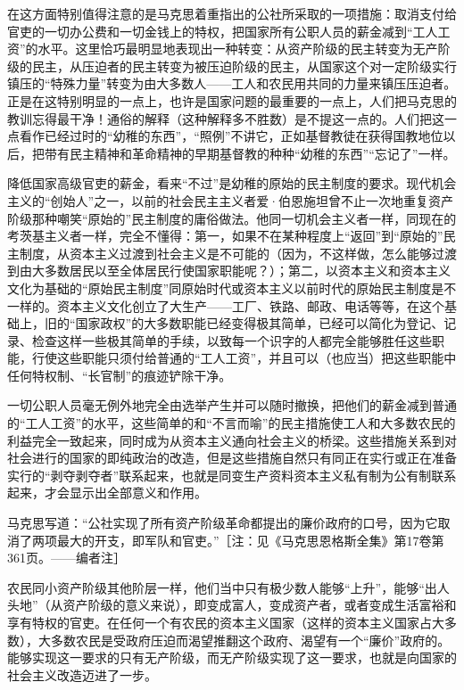 \documentclass[UTF8, 12pt, a4paper]{ctexrep}
\begin{document}
在这方面特别值得注意的是马克思着重指出的公社所采取的一项措施：取消支付给官吏的一切办公费和一切金钱上的特权，把国家所有公职人员的薪金减到“工人工资”的水平。这里恰巧最明显地表现出一种转变：从资产阶级的民主转变为无产阶级的民主，从压迫者的民主转变为被压迫阶级的民主，从国家这个对一定阶级实行镇压的“特殊力量”转变为由大多数人——工人和农民用共同的力量来镇压压迫者。正是在这特别明显的一点上，也许是国家问题的最重要的一点上，人们把马克思的教训忘得最干净！通俗的解释（这种解释多不胜数）是不提这一点的。人们把这一点看作已经过时的“幼稚的东西”，“照例”不讲它，正如基督教徒在获得国教地位以后，把带有民主精神和革命精神的早期基督教的种种“幼稚的东西”“忘记了”一样。

降低国家高级官吏的薪金，看来“不过”是幼稚的原始的民主制度的要求。现代机会主义的“创始人”之一，以前的社会民主主义者爱·伯恩施坦曾不止一次地重复资产阶级那种嘲笑“原始的”民主制度的庸俗做法。他同一切机会主义者一样，同现在的考茨基主义者一样，完全不懂得：第一，如果不在某种程度上“返回”到“原始的”民主制度，从资本主义过渡到社会主义是不可能的（因为，不这样做，怎么能够过渡到由大多数居民以至全体居民行使国家职能呢？）；第二，以资本主义和资本主义文化为基础的“原始民主制度”同原始时代或资本主义以前时代的原始民主制度是不一样的。资本主义文化创立了大生产——工厂、铁路、邮政、电话等等，在这个基础上，旧的“国家政权”的大多数职能已经变得极其简单，已经可以简化为登记、记录、检查这样一些极其简单的手续，以致每一个识字的人都完全能够胜任这些职能，行使这些职能只须付给普通的“工人工资”，并且可以（也应当）把这些职能中任何特权制、“长官制”的痕迹铲除干净。

一切公职人员毫无例外地完全由选举产生并可以随时撤换，把他们的薪金减到普通的“工人工资”的水平，这些简单的和“不言而喻”的民主措施使工人和大多数农民的利益完全一致起来，同时成为从资本主义通向社会主义的桥梁。这些措施关系到对社会进行的国家的即纯政治的改造，但是这些措施自然只有同正在实行或正在准备实行的“剥夺剥夺者”联系起来，也就是同变生产资料资本主义私有制为公有制联系起来，才会显示出全部意义和作用。

马克思写道：“公社实现了所有资产阶级革命都提出的廉价政府的口号，因为它取消了两项最大的开支，即军队和官吏。”［注：见《马克思恩格斯全集》第17卷第361页。——编者注］

农民同小资产阶级其他阶层一样，他们当中只有极少数人能够“上升”，能够“出人头地”（从资产阶级的意义来说），即变成富人，变成资产者，或者变成生活富裕和享有特权的官吏。在任何一个有农民的资本主义国家（这样的资本主义国家占大多数），大多数农民是受政府压迫而渴望推翻这个政府、渴望有一个“廉价”政府的。能够实现这一要求的只有无产阶级，而无产阶级实现了这一要求，也就是向国家的社会主义改造迈进了一步。
\end{document}
